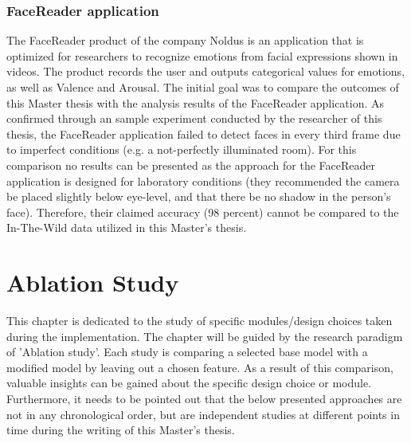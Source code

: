 \subsubsection{FaceReader application}
The FaceReader product of the company Noldus \citep{Noldus:2020:Facereader} is an application that is optimized for researchers to recognize emotions from facial expressions shown in videos. The product records the user and outputs categorical values for emotions, as well as Valence and Arousal. The initial goal was to compare the outcomes of this Master thesis with the analysis results of the FaceReader application.
\newline\newline
As confirmed through an sample experiment conducted by the researcher of this thesis, the FaceReader application failed to detect faces in every third frame due to imperfect conditions (e.g. a not-perfectly illuminated room). For this comparison no results can be presented as the approach for the FaceReader application is designed for laboratory conditions (they recommended the camera be placed slightly below eye-level, and that there be no shadow in the person's face). Therefore, their claimed accuracy (98 percent) cannot be compared to the In-The-Wild data utilized in this Master's thesis.


\section{Ablation Study}
This chapter is dedicated to the study of specific modules/design choices taken during the implementation. The chapter will be guided by the research paradigm of 'Ablation study'. Each study is comparing a selected base model with a modified model by leaving out a chosen feature. As a result of this comparison, valuable insights can be gained about the specific design choice or module. Furthermore, it needs to be pointed out that the below presented approaches are not in any chronological order, but are independent studies at different points in time during the writing of this Master's thesis.

